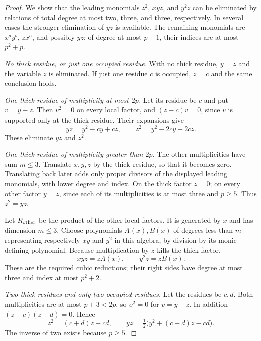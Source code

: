 \documentclass[11pt]{article}
\theoremstyle{remark}\newtheorem{remark}[theorem]{Remark}
\begin{document}
\begin{proof}
We show that the leading monomials $z^2$, $xyz$, and $y^2z$ can be eliminated by relations of total degree at most two, three, and three, respectively. In several cases the stronger elimination of $yz$ is available. The remaining monomials are $x^ay^b$, $zx^a$, and possibly $yz$; of degree at most $p-1$, their indices are at most $p^2+p$.

\emph{No thick residue, or just one occupied residue.} With no thick residue, $y=z$ and the variable $z$ is eliminated. If just one residue $c$ is occupied, $z=c$ and the same conclusion holds.

\emph{One thick residue of multiplicity at most $2p$.} Let its residue be $c$ and put $v=y-z$. Then $v^2=0$ on every local factor, and $(z-c)v=0$, since $v$ is supported only at the thick residue. Their expansions give
\begin{equation}\label{eq:one-moderate}
 yz=y^2-cy+cz,\qquad z^2=y^2-2cy+2cz.
\end{equation}
These eliminate $yz$ and $z^2$.

\emph{One thick residue of multiplicity greater than $2p$.} The other multiplicities have sum $m\le3$. Translate $x,y,z$ by the thick residue, so that it becomes zero. Translating back later adds only proper divisors of the displayed leading monomials, with lower degree and index. On the thick factor $z=0$; on every other factor $y=z$, since each of its multiplicities is at most three and $p\ge5$. Thus $z^2=yz$.

Let $R_{\rm other}$ be the product of the other local factors. It is generated by $x$ and has dimension $m\le3$. Choose polynomials $A(x),B(x)$ of degrees less than $m$ representing respectively $xy$ and $y^2$ in this algebra, by division by its monic defining polynomial. Because multiplication by $z$ kills the thick factor,
\begin{equation}\label{eq:one-large}
 xyz=zA(x),\qquad y^2z=zB(x).
\end{equation}
These are the required cubic reductions; their right sides have degree at most three and index at most $p^2+2$.

\emph{Two thick residues and only two occupied residues.} Let the residues be $c,d$. Both multiplicities are at most $p+3<2p$, so $v^2=0$ for $v=y-z$. In addition $(z-c)(z-d)=0$. Hence
\begin{equation}\label{eq:two-only}
 z^2=(c+d)z-cd,\qquad
 yz=\tfrac12\bigl(y^2+(c+d)z-cd\bigr).
\end{equation}
The inverse of two exists because $p\ge5$.


\end{proof}
\end{document}
